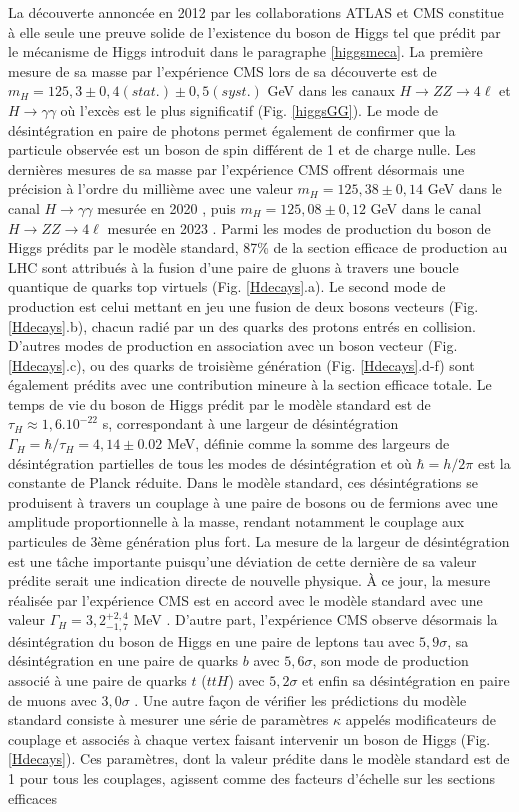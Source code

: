 La découverte annoncée en 2012 par les collaborations ATLAS et CMS constitue à elle seule une preuve solide de l'existence du boson de Higgs tel que prédit par le mécanisme de Higgs introduit dans le paragraphe \ref{higgsmeca}. La première mesure de sa masse par l'expérience CMS lors de sa découverte est de $m_{H}=125,3\pm0,4(stat.)\pm0,5(syst.)$ GeV dans les canaux $H\rightarrow ZZ\rightarrow 4\ell$ et $H\rightarrow \gamma\gamma$ où l'excès est le plus significatif (Fig. \ref{higgsGG}). Le mode de désintégration en paire de photons permet également de confirmer que la particule observée est un boson de spin différent de 1 et de charge nulle. Les dernières mesures de sa masse par l'expérience CMS offrent désormais une précision à l'ordre du millième avec une valeur $m_{H}=125,38\pm0,14$ GeV dans le canal $H\to\gamma\gamma$ mesurée en 2020 \cite{HiggsMass2020}, puis $m_{H}=125,08\pm0,12$ GeV dans le canal $H\to ZZ\to 4\ell$ mesurée en 2023 \cite{HiggsMass2023}. Parmi les modes de production du boson de Higgs prédits par le modèle standard, 87\% de la section efficace de production au LHC sont attribués à la fusion d'une paire de gluons à travers une boucle quantique de quarks top virtuels (Fig. \ref{Hdecays}.a). Le second mode de production est celui mettant en jeu une fusion de deux bosons vecteurs (Fig. \ref{Hdecays}.b), chacun radié par un des quarks des protons entrés en collision. D'autres modes de production en association avec un boson vecteur (Fig. \ref{Hdecays}.c), ou des quarks de troisième génération (Fig. \ref{Hdecays}.d-f) sont également prédits avec une contribution mineure à la section efficace totale. Le temps de vie du boson de Higgs prédit par le modèle standard est de $\tau_H\approx1,6.10^{-22}$ s, correspondant à une largeur de désintégration $\Gamma_{H}=\hbar/\tau_{H}=4,14\pm0.02$ MeV, définie comme la somme des largeurs de désintégration partielles de tous les modes de désintégration et où $\hbar=h/2\pi$ est la constante de Planck réduite. Dans le modèle standard, ces désintégrations se produisent à travers un couplage à une paire de bosons ou de fermions avec une amplitude proportionnelle à la masse, rendant notamment le couplage aux particules de 3ème génération plus fort. La mesure de la largeur de désintégration est une tâche importante puisqu'une déviation de cette dernière de sa valeur prédite serait une indication directe de nouvelle physique. À ce jour, la mesure réalisée par l'expérience CMS est en accord avec le modèle standard avec une valeur $\Gamma_{H}=3,2^{+2,4}_{-1,7}$ MeV \cite{HiggsWidth2022}. D'autre part, l'expérience CMS observe désormais la désintégration du boson de Higgs en une paire de leptons tau avec $5,9\sigma$, sa désintégration en une paire de quarks $b$ avec $5,6\sigma$, son mode de production associé à une paire de quarks $t$ ($ttH$) avec $5,2\sigma$ et enfin sa désintégration en paire de muons avec $3,0\sigma$ \cite{higgs10years}. Une autre façon de vérifier les prédictions du modèle standard consiste à mesurer une série de paramètres $\kappa$ appelés modificateurs de couplage et associés à chaque vertex faisant intervenir un boson de Higgs (Fig. \ref{Hdecays}). Ces paramètres, dont la valeur prédite dans le modèle standard est de 1 pour tous les couplages, agissent comme des facteurs d'échelle sur les sections efficaces 